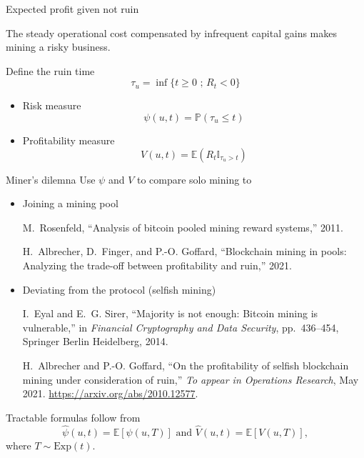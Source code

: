 \documentclass{beamer}
\begin{document}
\begin{frame}{Expected profit given not ruin}
\begin{tcolorbox}[enhanced,drop shadow, title=Fact]
The steady operational cost compensated by infrequent capital gains makes mining a risky business.
\end{tcolorbox}
Define the ruin time 
$$
\tau_u  = \inf\{t\geq0\text{ ; }R_t <0\}
$$
\begin{itemize}
  \item Risk measure 
  $$
  \psi(u,t) = \mathbb{P}(\tau_u \leq t)
  $$
  \item Profitability measure
  $$
  V(u,t) = \mathbb{E}(R_t\mathbb{I}_{\tau_u > t})
  $$
\end{itemize} 
\end{frame}
\begin{frame}{Miner's dilemna} 
Use $\psi$ and $V$ to compare solo mining to
\begin{itemize}
  \item Joining a mining pool
\tiny
  \begin{thebibliography}{1}

M.~Rosenfeld, ``Analysis of bitcoin pooled mining reward systems,'' 2011.

H.~Albrecher, D.~Finger, and P.-O. Goffard, ``Blockchain mining in pools:
  Analyzing the trade-off between profitability and ruin,'' 2021.


\end{thebibliography}
  \item \normalsize Deviating from the protocol (selfish mining)

  \tiny
  \begin{thebibliography}{1}
I.~Eyal and E.~G. Sirer, ``Majority is not enough: Bitcoin mining is
  vulnerable,'' in {\em Financial Cryptography and Data Security},
  pp.~436--454, Springer Berlin Heidelberg, 2014.

H.~Albrecher and P.-O. Goffard, ``{On the profitability of selfish blockchain
  mining under consideration of ruin},'' {\em To appear in Operations
  Research}, May 2021.
\newblock \url{https://arxiv.org/abs/2010.12577}.
\end{thebibliography}
\end{itemize}
Tractable formulas follow from 
$$
\widehat{\psi}(u,t)= \mathbb{E}[\psi(u,T)]\text{ and }\widehat{V}(u,t)= \mathbb{E}[V(u,T)],
$$
where $T\sim\text{Exp}(t)$.
\end{frame}
\end{document}
